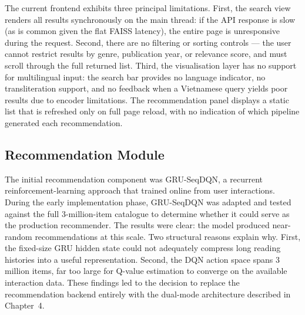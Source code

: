 The current frontend exhibits three principal limitations.
First, the search view renders all results synchronously on the main thread: if the API response is slow (as is common given the flat FAISS latency), the entire page is unresponsive during the request.
Second, there are no filtering or sorting controls — the user cannot restrict results by genre, publication year, or relevance score, and must scroll through the full returned list.
Third, the visualisation layer has no support for multilingual input: the search bar provides no language indicator, no transliteration support, and no feedback when a Vietnamese query yields poor results due to encoder limitations.
The recommendation panel displays a static list that is refreshed only on full page reload, with no indication of which pipeline generated each recommendation.

\subsection{Recommendation Module}
\label{sec:rec_analysis}

The initial recommendation component was GRU-SeqDQN, a recurrent reinforcement-learning approach that trained online from user interactions.
During the early implementation phase, GRU-SeqDQN was adapted and tested against the full 3-million-item catalogue to determine whether it could serve as the production recommender.
The results were clear: the model produced near-random recommendations at this scale.
Two structural reasons explain why.
First, the fixed-size GRU hidden state could not adequately compress long reading histories into a useful representation.
Second, the DQN action space spans 3 million items, far too large for Q-value estimation to converge on the available interaction data.
These findings led to the decision to replace the recommendation backend entirely with the dual-mode architecture described in Chapter~4.

